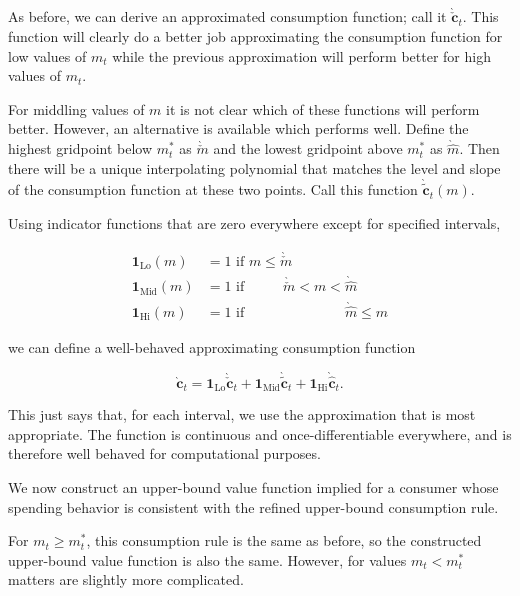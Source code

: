 \documentclass[twocolumn, switch]{article}
\newcommand{\mNrm}{m}
\newcommand{\cFunc}{\mathbf{c}}
\newcommand{\cFuncApprox}{\grave{\cFunc}}
\newcommand{\mNrmCusp}{\mNrm^*}
\newcommand{\cFuncLoTightUpBd}{\grave{\check{\cFunc}}}
\newcommand{\mNrmLoTightUpBd}{\grave{\check{\mNrm}}}
\newcommand{\mNrmHiTightUpBd}{\grave{\hat{\mNrm}}}
\newcommand{\cFuncMidTightUpBd}{\grave{\tilde{\cFunc}}}
\newcommand{\cFuncHiTightUpBd}{\grave{\hat{\cFunc}}}
\begin{document}
As before, we can derive an approximated consumption function; call it
$\cFuncLoTightUpBd_{t}$. This function will clearly do a better job approximating
the consumption function for low values of $\mNrm_{t}$ while the previous
approximation will perform better for high values of $\mNrm_{t}$.

For middling values of $\mNrm$ it is not clear which of these functions will
perform better. However, an alternative is available which performs well. Define
the highest gridpoint below $\mNrmCusp_{t}$ as $\mNrmLoTightUpBd$ and the lowest
gridpoint above $\mNrmCusp_{t}$ as $\mNrmHiTightUpBd$. Then there will be a unique
interpolating polynomial that matches the level and slope of the consumption
function at these two points. Call this function $\cFuncMidTightUpBd_{t}(\mNrm)$.

Using indicator functions that are zero everywhere except for specified
intervals,

\begin{equation}
\begin{aligned}
\mathbf{1}_{\text{Lo}}(\mNrm)  &= 1 \text{~if $\mNrm \leq \mNrmLoTightUpBd \phantom{< \mNrm < \mNrmHiTightUpBd \leq \mNrm}$} \\
\mathbf{1}_{\text{Mid}}(\mNrm) &= 1 \text{~if $\phantom{\mNrm \leq}~ \mNrmLoTightUpBd < \mNrm < \mNrmHiTightUpBd \phantom{\leq \mNrm}$} \\
\mathbf{1}_{\text{Hi}}(\mNrm)  &= 1 \text{~if $\phantom{\mNrm \leq ~\mNrmLoTightUpBd < \mNrm <} \mNrmHiTightUpBd \leq \mNrm$}
\end{aligned}
\end{equation}

we can define a well-behaved approximating consumption function

\begin{equation}
\cFuncApprox_{t} = \mathbf{1}_{\text{Lo}} \cFuncLoTightUpBd_{t} + \mathbf{1}_{\text{Mid}} \cFuncMidTightUpBd_{t}+\mathbf{1}_{\text{Hi}} \cFuncHiTightUpBd_{t}.
\end{equation}

This just says that, for each interval, we use the approximation that is most
appropriate. The function is continuous and once-differentiable everywhere, and
is therefore well behaved for computational purposes.

We now construct an upper-bound value function implied for a consumer whose
spending behavior is consistent with the refined upper-bound consumption rule.

For $\mNrm_{t} \geq \mNrmCusp_{t}$, this consumption rule is the same as
before, so the constructed upper-bound value function is also the same. However,
for values $\mNrm_{t} < \mNrmCusp_{t}$ matters are slightly more complicated.
\end{document}
